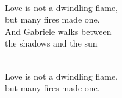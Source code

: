 \begin{lyrics}
\\
Love is not a dwindling flame,\\
but many fires made one.\\
And Gabriele walks between\\
the shadows and the sun


\\
Love is not a dwindling flame,\\
but many fires made one.


\end{lyrics}

